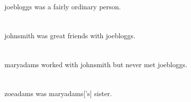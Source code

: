 \documentclass{report}
\begin{document}
\tableofcontents

\chapter{}

\gls{joebloggs} was a fairly ordinary person.

\chapter{}

\gls{johnsmith} was great friends with \gls{joebloggs}.

\chapter{}

\gls{maryadams} worked with \gls{johnsmith} but never met
\gls{joebloggs}.

\chapter{}

\gls{zoeadams} was \gls{maryadams}['s] sister.
\printglossaries
\end{document}
